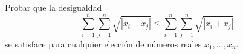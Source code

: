 Probar que la desigualdad
\[\sum_{i=1}^n \sum_{j=1}^n \sqrt{|x_i-x_j|}\leqslant \sum_{i=1}^n \sum_{j=1}^n \sqrt{|x_i+x_j|}\]
se satisface para cualquier elección de números reales $x_1, \dots , x_n$.